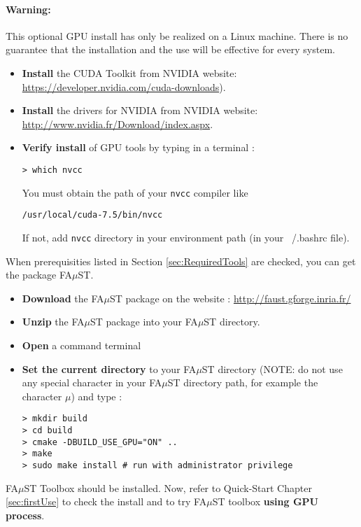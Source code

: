 \paragraph{Warning:} This optional GPU install has only be realized on a Linux machine. There is no guarantee that the installation and the use will be effective for every system.

\begin{itemize}
\item \textbf{Install} the CUDA Toolkit from NVIDIA website:\\
\url{https://developer.nvidia.com/cuda-downloads}).
\item \textbf{Install} the drivers for NVIDIA from NVIDIA website:\\ \url{http://www.nvidia.fr/Download/index.aspx}.
\item \textbf{Verify install} of GPU tools by typing in a terminal :
\lstset{style=customBash} 
\begin{lstlisting}
> which nvcc
\end{lstlisting}
You must obtain the path of your \texttt{nvcc} compiler like 
\begin{lstlisting}
/usr/local/cuda-7.5/bin/nvcc
\end{lstlisting}
If not, add \texttt{nvcc} directory in your environment path (in your ~/.bashrc file). 
\end{itemize}

When prerequisities listed in Section \ref{sec:RequiredTools} are checked, you can get the package FA$\mu$ST.
\begin{itemize}
\item \textbf{Download} the FA$\mu$ST package on the website :  \url{http://faust.gforge.inria.fr/}
\item \textbf{Unzip} the FA$\mu$ST package into your FA$\mu$ST directory.
\item \textbf{Open} a command terminal
\item \textbf{Set the current directory} to your FA$\mu$ST directory (NOTE: do not use any special character in your FA$\mu$ST directory path, for example the character $\mu$) and type :

\lstset{style=customBash}
\begin{lstlisting}
> mkdir build
> cd build
> cmake -DBUILD_USE_GPU="ON" ..
> make
> sudo make install # run with administrator privilege
\end{lstlisting}

\end{itemize}


FA$\mu$ST Toolbox should be installed. Now, refer to Quick-Start Chapter \ref{sec:firstUse} to check the install and to try FA$\mu$ST toolbox \textbf{using GPU process}.

